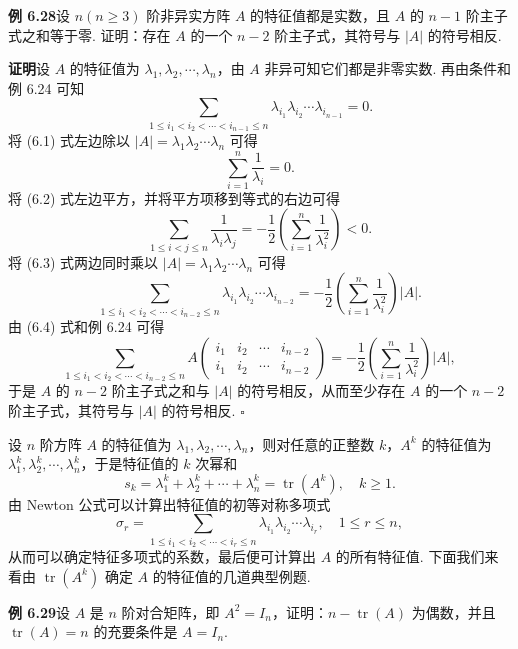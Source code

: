 \documentclass[UTF8,12pt,a4paper,fontset=fandol]{ctexart}
\begin{document}
\noindent\textbf{例 6.28}\quad 设 $n(n\ge 3)$ 阶非异实方阵 $A$ 的特征值都是实数，且 $A$ 的 $n-1$ 阶主子式之和等于零. 证明：存在 $A$ 的一个 $n-2$ 阶主子式，其符号与 $|A|$ 的符号相反.

\noindent\textbf{证明}\quad 设 $A$ 的特征值为 $\lambda_1,\lambda_2,\cdots,\lambda_n$，由 $A$ 非异可知它们都是非零实数. 再由条件和例 6.24 可知
\begin{equation}
\sum_{1\le i_1<i_2<\cdots<i_{n-1}\le n}
\lambda_{i_1}\lambda_{i_2}\cdots\lambda_{i_{n-1}}=0.
\tag{6.1}
\end{equation}
将 (6.1) 式左边除以 $|A|=\lambda_1\lambda_2\cdots\lambda_n$ 可得
\begin{equation}
\sum_{i=1}^n\frac{1}{\lambda_i}=0.
\tag{6.2}
\end{equation}
将 (6.2) 式左边平方，并将平方项移到等式的右边可得
\begin{equation}
\sum_{1\le i<j\le n}\frac{1}{\lambda_i\lambda_j}
=-\frac{1}{2}\left(\sum_{i=1}^n\frac{1}{\lambda_i^2}\right)<0.
\tag{6.3}
\end{equation}
将 (6.3) 式两边同时乘以 $|A|=\lambda_1\lambda_2\cdots\lambda_n$ 可得
\begin{equation}
\sum_{1\le i_1<i_2<\cdots<i_{n-2}\le n}
\lambda_{i_1}\lambda_{i_2}\cdots\lambda_{i_{n-2}}
=-\frac{1}{2}\left(\sum_{i=1}^n\frac{1}{\lambda_i^2}\right)|A|.
\tag{6.4}
\end{equation}
由 (6.4) 式和例 6.24 可得
\[
\sum_{1\le i_1<i_2<\cdots<i_{n-2}\le n}
A\left(\begin{array}{cccc}
i_1 & i_2 & \cdots & i_{n-2}\\
i_1 & i_2 & \cdots & i_{n-2}
\end{array}\right)
=-\frac{1}{2}\left(\sum_{i=1}^n\frac{1}{\lambda_i^2}\right)|A|,
\]
于是 $A$ 的 $n-2$ 阶主子式之和与 $|A|$ 的符号相反，从而至少存在 $A$ 的一个 $n-2$ 阶主子式，其符号与 $|A|$ 的符号相反. $\square$

设 $n$ 阶方阵 $A$ 的特征值为 $\lambda_1,\lambda_2,\cdots,\lambda_n$，则对任意的正整数 $k$，$A^k$ 的特征值为 $\lambda_1^k,\lambda_2^k,\cdots,\lambda_n^k$，于是特征值的 $k$ 次幂和
\[
s_k=\lambda_1^k+\lambda_2^k+\cdots+\lambda_n^k=\operatorname{tr}(A^k),\quad k\ge 1.
\]
由 Newton 公式可以计算出特征值的初等对称多项式
\[
\sigma_r=\sum_{1\le i_1<i_2<\cdots<i_r\le n}\lambda_{i_1}\lambda_{i_2}\cdots\lambda_{i_r},\quad 1\le r\le n,
\]
从而可以确定特征多项式的系数，最后便可计算出 $A$ 的所有特征值. 下面我们来看由 $\operatorname{tr}(A^k)$ 确定 $A$ 的特征值的几道典型例题.

\noindent\textbf{例 6.29}\quad 设 $A$ 是 $n$ 阶对合矩阵，即 $A^2=I_n$，证明：$n-\operatorname{tr}(A)$ 为偶数，并且 $\operatorname{tr}(A)=n$ 的充要条件是 $A=I_n$.
\end{document}

